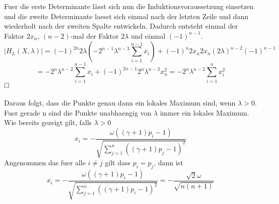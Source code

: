 \documentclass[11pt]{scrartcl}
\begin{document}
			Fuer die erste Determinante lässt sich nun die Induktionsvoraussetzung einsetzen und die zweite Determinante laesst sich einmal nach der letzten Zeile und dann wiederholt nach der zweiten Spalte entwickeln. Dadurch entsteht einmal der Faktor \(2x_{n}\), \((n-2)\)-mal der Faktor \(2\lambda\) und einmal \((-1)^{n-1}\).
			\begin{equation}
			|H_{L}(X,\lambda)|=(-1)^{2n}2\lambda(-2^{n-1}\lambda^{n-3}\sum_{i=1}^{n-1}x_{i})+(-1)^{n}2x_{n}2x_{n}(2\lambda)^{n-2}(-1)^{n-1}
			\end{equation}
			\begin{equation}
			=-2^{n}\lambda^{n-2}\sum_{i=1}^{n-1}x_{i}+(-1)^{2n-1}2^{n}\lambda^{n-2}x_{n}^{2}
			=-2^n\lambda^{n-2}\sum_{i=1}^{n}x_{i}^2
			\end{equation}
			$\hfill\square$\\\\
			Daraus folgt, dass die Punkte genau dann ein lokales Maximum sind, wenn \(\lambda>0\). Fuer gerade n sind die Punkte unabhaengig von \(\lambda\) immer ein lokales Maximum. Wie bereits gezeigt gilt, falls \(\lambda>0\)
			\begin{equation}
			x_{i}=-\frac{\omega((\gamma +1)p_{i}-1)}{\sqrt{\sum_{j=1}^{n}((\gamma +1)p_{j}-1)^2}}
			\end{equation}
			Angenommen das fuer alle \(i\neq j\) gilt dass \(p_{i}=p_{j}\), dann ist
			\begin{equation}
			x_{i}=-\frac{\omega((\gamma +1)p_{i}-1)}{\sqrt{\sum_{j=1}^{n}((\gamma +1)p_{i}-1)^2}}
			=-\frac{\sqrt{2}\omega}{\sqrt{n(n+1)}}
			\end{equation}
\end{document}

